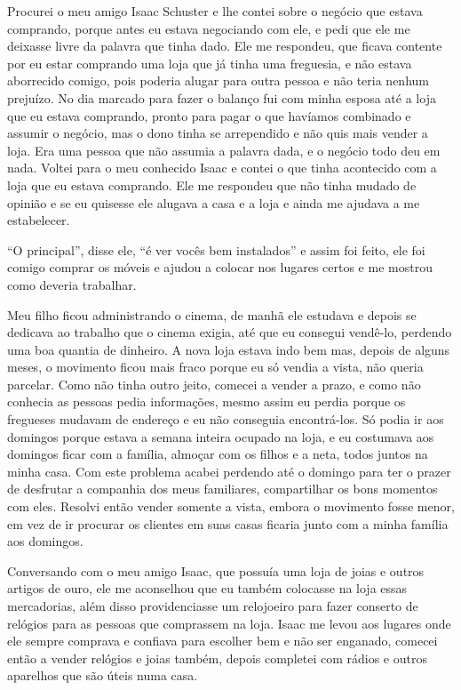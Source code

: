 Procurei o meu amigo Isaac Schuster e lhe contei sobre o negócio que
estava comprando, porque antes eu estava negociando com ele, e pedi que
ele me deixasse livre da palavra que tinha dado. Ele me respondeu, que
ficava contente por eu estar comprando uma loja que já tinha uma
freguesia, e não estava aborrecido comigo, pois poderia alugar para
outra pessoa e não teria nenhum prejuízo. No dia marcado para fazer o
balanço fui com minha esposa até a loja que eu estava comprando, pronto
para pagar o que havíamos combinado e assumir o negócio, mas o dono
tinha se arrependido e não quis mais vender a loja. Era uma pessoa que
não assumia a palavra dada, e o negócio todo deu em nada. Voltei para o
meu conhecido Isaac e contei o que tinha acontecido com a loja que eu
estava comprando. Ele me respondeu que não tinha mudado de opinião e se
eu quisesse ele alugava a casa e a loja e ainda me ajudava a me
estabelecer.

``O principal'', disse ele, ``é ver vocês bem instalados'' e assim foi
feito, ele foi comigo comprar os móveis e ajudou a colocar nos lugares
certos e me mostrou como deveria trabalhar.

Meu filho ficou administrando o cinema, de manhã ele estudava e depois
se dedicava ao trabalho que o cinema exigia, até que eu consegui
vendê-lo, perdendo uma boa quantia de dinheiro. A nova loja estava indo
bem mas, depois de alguns meses, o movimento ficou mais fraco porque eu
só vendia a vista, não queria parcelar. Como não tinha outro jeito,
comecei a vender a prazo, e como não conhecia as pessoas pedia
informações, mesmo assim eu perdia porque os fregueses mudavam de
endereço e eu não conseguia encontrá-los. Só podia ir aos domingos
porque estava a semana inteira ocupado na loja, e eu costumava aos
domingos ficar com a família, almoçar com os filhos e a neta, todos
juntos na minha casa. Com este problema acabei perdendo até o domingo
para ter o prazer de desfrutar a companhia dos meus familiares,
compartilhar os bons momentos com eles. Resolvi então vender somente a
vista, embora o movimento fosse menor, em vez de ir procurar os clientes
em suas casas ficaria junto com a minha família aos domingos.

Conversando com o meu amigo Isaac, que possuía uma loja de joias e
outros artigos de ouro, ele me aconselhou que eu também colocasse na
loja essas mercadorias, além disso providenciasse um relojoeiro para
fazer conserto de relógios para as pessoas que comprassem na loja. Isaac
me levou aos lugares onde ele sempre comprava e confiava para escolher
bem e não ser enganado, comecei então a vender relógios e joias também,
depois completei com rádios e outros aparelhos que são úteis numa casa.

